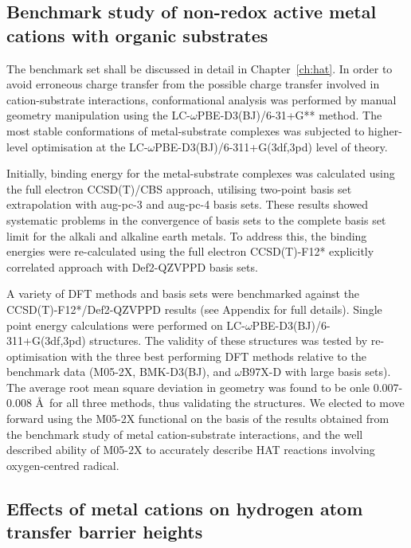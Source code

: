 \subsection{Benchmark study of non-redox active metal cations with organic
  substrates}

The benchmark set shall be discussed in detail in Chapter~\ref{ch:hat}. In order
to avoid erroneous charge transfer from the possible charge transfer involved in
cation-substrate interactions, conformational analysis was performed by manual
geometry manipulation using the LC-$\omega$PBE-D3(BJ)/6-31+G**
method.\cite{Johnson2013a} The most stable conformations of metal-substrate
complexes was subjected to higher-level optimisation at the
LC-$\omega$PBE-D3(BJ)/6-311+G(3df,3pd) level of theory.

Initially, binding energy for the metal-substrate complexes was calculated using
the full electron CCSD(T)/CBS approach, utilising two-point basis set
extrapolation with aug-pc-3 and aug-pc-4 basis sets. These results showed
systematic problems in the convergence of basis sets to the complete basis set
limit for the alkali and alkaline earth metals. To address this, the binding
energies were re-calculated using the full electron CCSD(T)-F12* explicitly
correlated approach\cite{Hattig2010} with Def2-QZVPPD basis sets.

A variety of DFT methods and basis sets were benchmarked against the
CCSD(T)-F12*/Def2-QZVPPD results (see Appendix  for full
details). Single point energy calculations were performed on
LC-$\omega$PBE-D3(BJ)/6-311+G(3df,3pd) structures. The validity of these
structures was tested by re-optimisation with the three best performing DFT
methods relative to the benchmark data (M05-2X, BMK-D3(BJ), and $\omega$B97X-D
with large basis sets). The average root mean square deviation in geometry was
found to be onle 0.007-0.008 \AA ~for all three methods, thus validating the
structures. We elected to move forward using the M05-2X functional on the basis
of the results obtained from the benchmark study of metal cation-substrate
interactions, and the well described ability of M05-2X to accurately describe
HAT reactions involving oxygen-centred radical.\cite{Galano2013}


\subsection{Effects of metal cations on hydrogen atom transfer barrier heights}



